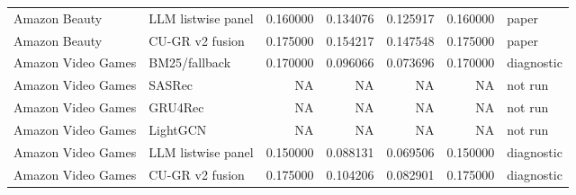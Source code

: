 \begin{tabular}{llrrrrl}
Amazon Beauty & LLM listwise panel & 0.160000 & 0.134076 & 0.125917 & 0.160000 & paper \\
Amazon Beauty & CU-GR v2 fusion & 0.175000 & 0.154217 & 0.147548 & 0.175000 & paper \\
Amazon Video Games & BM25/fallback & 0.170000 & 0.096066 & 0.073696 & 0.170000 & diagnostic \\
Amazon Video Games & SASRec & NA & NA & NA & NA & not run \\
Amazon Video Games & GRU4Rec & NA & NA & NA & NA & not run \\
Amazon Video Games & LightGCN & NA & NA & NA & NA & not run \\
Amazon Video Games & LLM listwise panel & 0.150000 & 0.088131 & 0.069506 & 0.150000 & diagnostic \\
Amazon Video Games & CU-GR v2 fusion & 0.175000 & 0.104206 & 0.082901 & 0.175000 & diagnostic \\
\bottomrule
\end{tabular}
